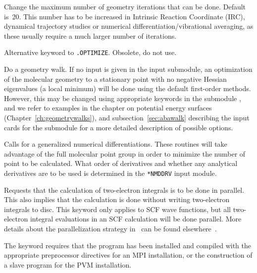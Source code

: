 \begin{description}
Change the maximum number of geometry iterations that can be done. Default
is~20. This number has to be increased in Intrinsic Reaction Coordinate
(IRC), dynamical
trajectory studies or numerical differentiation/vibrational averaging, as these
usually require a much larger number of iterations.

\item[\Key{MINIMIZE}] Alternative keyword to \verb|.OPTIMIZE|. Obsolete,
do not use.

\item[\Key{OPTIMIZE}] Do a geometry walk. If no
input is given in the
 input submodule, an optimization of the molecular
geometry to a stationary point with no
negative Hessian eigenvalues (a
local minimum) will be done using the default first-order
methods. However, this may be changed using appropriate
keywords in the submodule , and we refer to examples in
the chapter on potential energy surfaces
(Chapter~\ref{ch:geometrywalks}), and  subsection~\ref{sec:abawalk}
describing the input cards for the  submodule for a more
detailed description of possible options.

\item[\Key{NMDDRV}] Calls for a generalized numerical
differentiations. These routines will take advantage of the full
molecular point group in order to minimize the number of point to be
calculated. What order of derivatives and whether any analytical
derivatives are to be used is determined in the \verb|*NMDDRV| input
module. 

\item[\Key{PARALL}] Requests that the calculation of two-electron
integrals
is to be done in parallel. This also
implies that the calculation is
done without writing two-electron integrals to disc. This keyword only
applies to SCF wave
functions, but all two-electron integral
evaluations in an SCF calculation will be done parallel. More details
about the parallelization strategy in \siraba\ can be found
elsewhere~\cite{pndjhapdkrthhkcpl253}.

The keyword requires that the program has been installed and compiled
with the appropriate preprocessor directives for an MPI
installation, or the construction of a slave program for
the PVM installation.


\end{description}

